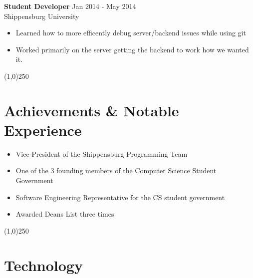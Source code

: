 \documentclass[margin,line, 11pt]{resume}
\begin{document}
\begin{resume}
    \textbf{Student Developer} 	\hfill Jan 2014 - May 2014 \vspace{1.5mm}\\
    Shippensburg University 
    \begin{itemize}
      \item Learned how to more efficently debug server/backend issues while using git
      \item Worked primarily on the server getting the backend to work how we wanted it.
    \end{itemize}
    
    \vspace{-5mm}
    \line(1,0){250}

    
    \section{\mysidestyle \textbf {Achievements \& Notable Experience} }
    
    \vspace{0mm}
    \begin{itemize}

    \item Vice-President of the Shippensburg Programming Team							%
    \item One of the 3 founding members of the Computer Science Student Government				
    \item Software Engineering Representative for the CS student government		
    \item Awarded Deans List three times
    
    \end{itemize}
    
    \vspace{-7mm}
    \line(1,0){250}
    
   
    \section{\mysidestyle \textbf {Technology} }
    

\end{resume}
\end{document}
